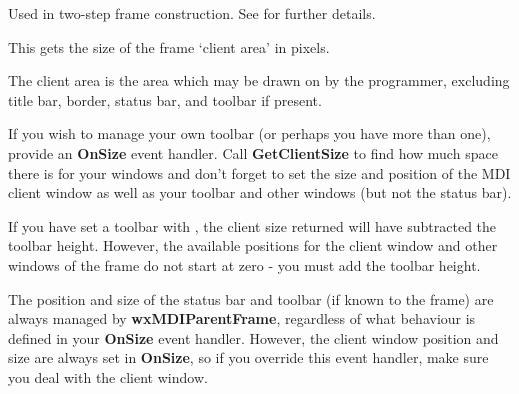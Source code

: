 \label{wxmdiparentframecreate}


Used in two-step frame construction. See \rtfsp
for further details.

\label{wxmdiparentframegetclientsize}


This gets the size of the frame `client area' in pixels.





The client area is the area which may be drawn on by the programmer, excluding title bar, border, status bar,
and toolbar if present.

If you wish to manage your own toolbar (or perhaps you have more than one),
provide an {\bf OnSize} event handler. Call {\bf GetClientSize} to
find how much space there is for your windows and don't forget to set the size and position
of the MDI client window as well as your toolbar and other windows (but not the status bar).

If you have set a toolbar with ,
the client size returned will have subtracted the toolbar height. However, the available positions
for the client window and other windows of the frame do not start at zero - you must add the toolbar height.

The position and size of the status bar and toolbar (if known to the frame) are always managed
by {\bf wxMDIParentFrame}, regardless of what behaviour is defined in your {\bf OnSize} event handler.
However, the client window position and size are always set in {\bf OnSize}, so if you override this
event handler, make sure you deal with the client window.

